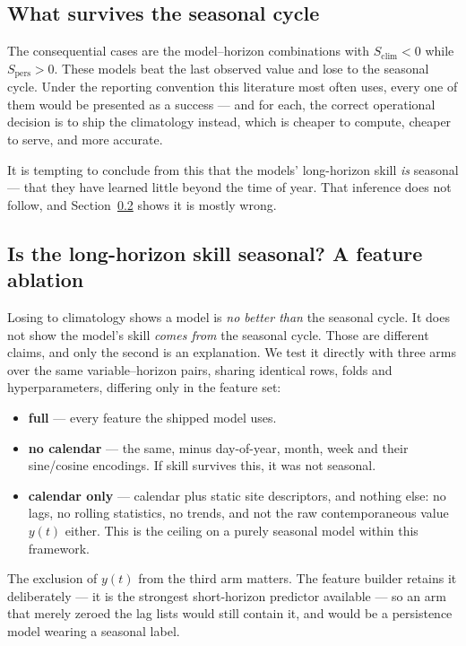 \subsection{What survives the seasonal cycle}

The consequential cases are the \NLoseToClim{} model--horizon combinations with
$S_{\mathrm{clim}} < 0$ while $S_{\mathrm{pers}} > 0$. These models beat the
last observed value and lose to the seasonal cycle. Under the reporting
convention this literature most often uses, every one of them would be
presented as a success --- and for each, the correct operational decision is to
ship the climatology instead, which is cheaper to compute, cheaper to serve,
and more accurate.

It is tempting to conclude from this that the models' long-horizon skill
\emph{is} seasonal --- that they have learned little beyond the time of year.
That inference does not follow, and Section~\ref{sec:ablation} shows it is
mostly wrong.

\subsection{Is the long-horizon skill seasonal? A feature ablation}
\label{sec:ablation}

Losing to climatology shows a model is \emph{no better than} the seasonal
cycle. It does not show the model's skill \emph{comes from} the seasonal cycle.
Those are different claims, and only the second is an explanation. We test it
directly with three arms over the same \NAblationPairs{} variable--horizon
pairs, sharing identical rows, folds and hyperparameters, differing only in the
feature set:

\begin{itemize}\itemsep2pt
\item \textbf{full} --- every feature the shipped model uses.
\item \textbf{no calendar} --- the same, minus day-of-year, month, week and
their sine/cosine encodings. If skill survives this, it was not seasonal.
\item \textbf{calendar only} --- calendar plus static site descriptors, and
nothing else: no lags, no rolling statistics, no trends, and not the raw
contemporaneous value $y(t)$ either. This is the ceiling on a purely seasonal
model within this framework.
\end{itemize}

The exclusion of $y(t)$ from the third arm matters. The feature builder retains
it deliberately --- it is the strongest short-horizon predictor available ---
so an arm that merely zeroed the lag lists would still contain it, and would be
a persistence model wearing a seasonal label.

